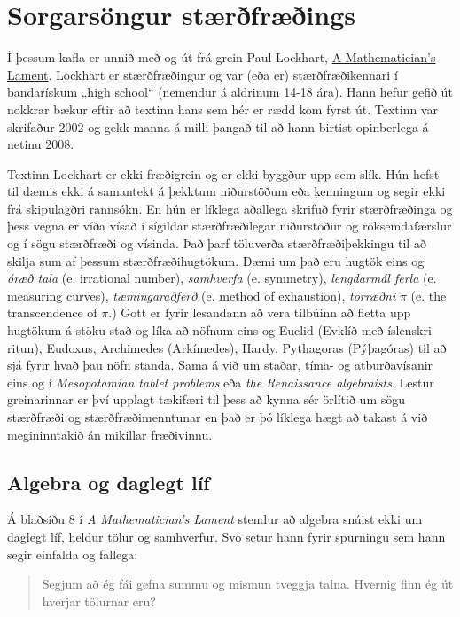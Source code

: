 \documentclass[
  icelandic,
]{book}
\theoremstyle{definition}
\theoremstyle{definition}
\theoremstyle{definition}
\theoremstyle{definition}
\theoremstyle{remark}
\begin{document}
\chapter{Sorgarsöngur stærðfræðings}\label{sorgarsongur}

Í þessum kafla er unnið með og út frá grein Paul Lockhart, \href{https://archive.org/details/AMathematiciansLament}{A Mathematician's Lament}. Lockhart er stærðfræðingur og var (eða er) stærðfræðikennari í bandarískum „high school`` (nemendur á aldrinum 14-18 ára). Hann hefur gefið út nokkrar bækur eftir að textinn hans sem hér er rædd kom fyrst út. Textinn var skrifaður 2002 og gekk manna á milli þangað til að hann birtist opinberlega á netinu 2008.

Textinn Lockhart er ekki fræðigrein og er ekki byggður upp sem slík. Hún hefst til dæmis ekki á samantekt á þekktum niðurstöðum eða kenningum og segir ekki frá skipulagðri rannsókn. En hún er líklega aðallega skrifuð fyrir stærðfræðinga og þess vegna er víða vísað í sígildar stærðfræðilegar niðurstöður og röksemdafærslur og í sögu stærðfræði og vísinda. Það þarf töluverða stærðfræðiþekkingu til að skilja sum af þessum stærðfræðihugtökum. Dæmi um það eru hugtök eins og \emph{óræð tala} (e. irrational number), \emph{samhverfa} (e. symmetry), \emph{lengdarmál ferla} (e. measuring curves), \emph{tæmingaraðferð} (e. method of exhaustion), \emph{torræðni} \(\pi\) (e. the transcendence of \(\pi\).) Gott er fyrir lesandann að vera tilbúinn að fletta upp hugtökum á stöku stað og líka að nöfnum eins og Euclid (Evklíð með íslenskri ritun), Eudoxus, Archimedes (Arkímedes), Hardy, Pythagoras (Pýþagóras) til að sjá fyrir hvað þau nöfn standa. Sama á við um staðar, tíma- og atburðavísanir eins og í \emph{Mesopotamian tablet problems} eða \emph{the Renaissance algebraists}. Lestur greinarinnar er því upplagt tækifæri til þess að kynna sér örlítið um sögu stærðfræði og stærðfræðimenntunar en það er þó líklega hægt að takast á við megininntakið án mikillar fræðivinnu.

\section{Algebra og daglegt líf}\label{algebra-daglegt-lif}

Á blaðsíðu 8 í \emph{A Mathematician's Lament} stendur að algebra snúist ekki um daglegt líf, heldur tölur og samhverfur. Svo setur hann fyrir spurningu sem hann segir einfalda og fallega:

\begin{quote}
Segjum að ég fái gefna summu og mismun tveggja talna. Hvernig finn ég út hverjar tölurnar eru?
\end{quote}
\end{document}
